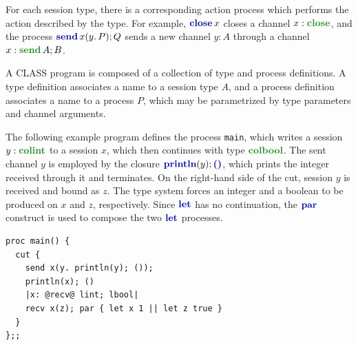 \documentclass[sigconf,nonacm,natbib=true]{acmart}
\begin{document}
For each session type, there is a corresponding action process which performs the action described by the type. For example, $\closec{x}$ closes a channel $x: \closet$, and the process $\sendc{x}{y}{P}{Q}$ sends a new channel $y: A$ through a channel $x: \sendt{A}{B}$.

A \ac{CLASS} program is composed of a collection of type and process definitions. A type definition associates a name to a session type $A$, and a process definition associates a name to a process $P$, which may be parametrized by type parameters and channel arguments.

The following example program defines the process \texttt{main}, which writes a session $y: \colintt$ to a session $x$, which then continues with type $\colboolt$. The sent channel $y$ is employed by the closure $\printlnc{y}{\emptyc}$, which prints the integer received through it and terminates. On the right-hand side of the cut, session $y$ is received and bound as $z$. The type system forces an integer and a boolean to be produced on $x$ and $z$, respectively. Since $\letp$ has no continuation, the $\parp$ construct is used to compose the two $\letp$ processes.

\begin{lstlisting}[language=CLASS]
proc main() {
  cut {
    send x(y. println(y); ());
    println(x); ()
    |x: @recv@ lint; lbool|
    recv x(z); par { let x 1 || let z true }
  }
};;
\end{lstlisting}



\end{document}
